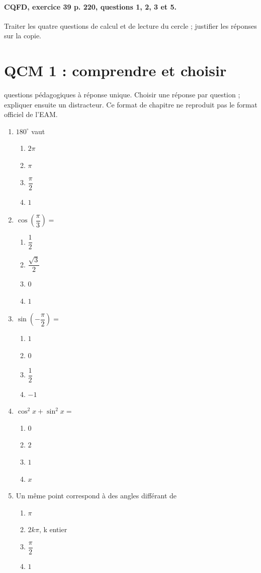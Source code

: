 \paragraph{CQFD, exercice 39 p. 220, questions 1, 2, 3 et 5.}\label{C10-M2} Traiter les quatre questions de calcul et de lecture du cercle ; justifier les réponses sur la copie.
\begingroup\small
\mxnewpage\section*{QCM 1 : comprendre et choisir}\label{C10-Q1}
 questions pédagogiques à réponse unique. Choisir une réponse par question ; expliquer ensuite un distracteur. Ce format de chapitre ne reproduit pas le format officiel de l’EAM.
\begin{enumerate}
\item $180^\circ$ vaut
\begin{enumerate}[label=\Alph*.,itemsep=2pt]
\item $2\pi$
\item $\pi$
\item $\dfrac{\pi}{2}$
\item $1$
\end{enumerate}
\item $\cos (\dfrac{\pi}{3})=$
\begin{enumerate}[label=\Alph*.,itemsep=2pt]
\item $\dfrac{1}{2}$
\item $\dfrac{\sqrt 3}{2}$
\item $0$
\item $1$
\end{enumerate}
\item $\sin (-\dfrac{\pi}{2})=$
\begin{enumerate}[label=\Alph*.,itemsep=2pt]
\item $1$
\item $0$
\item $\dfrac{1}{2}$
\item $-1$
\end{enumerate}
\item $\cos^2x+\sin^2x=$
\begin{enumerate}[label=\Alph*.,itemsep=2pt]
\item $0$
\item $2$
\item $1$
\item $x$
\end{enumerate}
\item Un même point correspond à des angles différant de
\begin{enumerate}[label=\Alph*.,itemsep=2pt]
\item $\pi$
\item $2k\pi$, k entier
\item $\dfrac{\pi}{2}$
\item $1$
\end{enumerate}
\end{enumerate}
